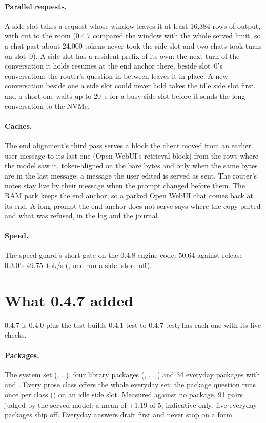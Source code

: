 \paragraph{Parallel requests.} A side slot takes a request whose window leaves it at least 16,384 rows of output, with  cut to the room (0.4.7 compared the window with the whole served limit, so a chat past about 24,000 tokens never took the side slot and two chats took turns on slot~0). A side slot has a resident prefix of its own: the next turn of the conversation it holds resumes at the end anchor there, beside slot~0's conversation; the router's question in between leaves it in place. A new conversation beside one a side slot could never hold takes the idle side slot first, and a short one waits up to 20~s for a busy side slot before it sends the long conversation to the NVMe.

\paragraph{Caches.} The end alignment's third pass serves a block the client moved from an earlier user message to its last one (Open WebUI's retrieval block) from the rows where the model saw it, token-aligned on the bare bytes and only when the same bytes are in the last message; a message the user edited is served as sent. The router's notes stay live by their message when the prompt changed before them. The RAM park keeps the end anchor, so a parked Open WebUI chat comes back at its end. A long prompt the end anchor does not serve says where the copy parted and what was refused, in the log and the journal.

\paragraph{Speed.} The speed guard's short gate on the 0.4.8 engine code: 50.64 against release 0.3.0's 49.75~tok/s (\measured, one run a side, store off).

\section{What 0.4.7 added}

0.4.7 is 0.4.0 plus the test builds 0.4.1-test to 0.4.7-test;  has each one with its live checks.

\paragraph{Packages.} The system set (, , ), four library packages (, , , ) and 34 everyday packages with  and . Every prose class offers the whole everyday set; the package question runs once per class () on an idle side slot. Measured against no package, 91 pairs judged by the served model: a mean of +1.19 of 5, indicative only; five everyday packages ship off. Everyday answers draft first and never stop on a form.

